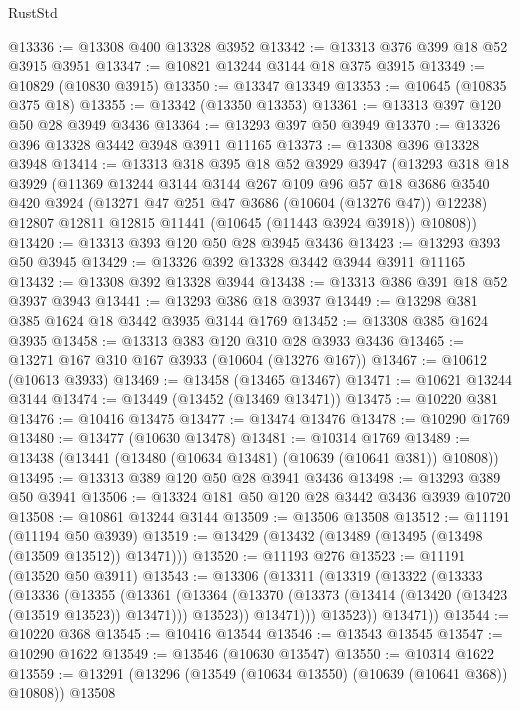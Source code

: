 \begin{lexlean}{RustStd}
\begin{coremodule}
@13336 := @13308 @400 @13328 @3952
@13342 := @13313 @376 @399 @18 @52 @3915 @3951
@13347 := @10821 @13244 @3144 @18 @375 @3915
@13349 := @10829 (@10830 @3915)
@13350 := @13347 @13349
@13353 := @10645 (@10835 @375 @18)
@13355 := @13342 (@13350 @13353)
@13361 := @13313 @397 @120 @50 @28 @3949 @3436
@13364 := @13293 @397 @50 @3949
@13370 := @13326 @396 @13328 @3442 @3948 @3911 @11165
@13373 := @13308 @396 @13328 @3948
@13414 := @13313
    @318
    @395
    @18
    @52
    @3929
    @3947
    (@13293
      @318
      @18
      @3929
      (@11369
        @13244
        @3144
        @3144
        @267
        @109
        @96
        @57
        @18
        @3686
        @3540
        @420
        @3924
        (@13271 @47 @251 @47 @3686 (@10604 (@13276 @47)) @12238)
        @12807
        @12811
        @12815
        @11441
        (@10645 (@11443 @3924 @3918))
        @10808))
@13420 := @13313 @393 @120 @50 @28 @3945 @3436
@13423 := @13293 @393 @50 @3945
@13429 := @13326 @392 @13328 @3442 @3944 @3911 @11165
@13432 := @13308 @392 @13328 @3944
@13438 := @13313 @386 @391 @18 @52 @3937 @3943
@13441 := @13293 @386 @18 @3937
@13449 := @13298 @381 @385 @1624 @18 @3442 @3935 @3144 @1769
@13452 := @13308 @385 @1624 @3935
@13458 := @13313 @383 @120 @310 @28 @3933 @3436
@13465 := @13271 @167 @310 @167 @3933 (@10604 (@13276 @167))
@13467 := @10612 (@10613 @3933)
@13469 := @13458 (@13465 @13467)
@13471 := @10621 @13244 @3144
@13474 := @13449 (@13452 (@13469 @13471))
@13475 := @10220 @381
@13476 := @10416 @13475
@13477 := @13474 @13476
@13478 := @10290 @1769
@13480 := @13477 (@10630 @13478)
@13481 := @10314 @1769
@13489 := @13438 (@13441 (@13480 (@10634 @13481) (@10639 (@10641 @381)) @10808))
@13495 := @13313 @389 @120 @50 @28 @3941 @3436
@13498 := @13293 @389 @50 @3941
@13506 := @13324 @181 @50 @120 @28 @3442 @3436 @3939 @10720
@13508 := @10861 @13244 @3144
@13509 := @13506 @13508
@13512 := @11191 (@11194 @50 @3939)
@13519 := @13429 (@13432 (@13489 (@13495 (@13498 (@13509 @13512)) @13471)))
@13520 := @11193 @276
@13523 := @11191 (@13520 @50 @3911)
@13543 := @13306
    (@13311
      (@13319
        (@13322
          (@13333
            (@13336
              (@13355
                (@13361
                  (@13364
                    (@13370 (@13373 (@13414 (@13420 (@13423 (@13519 @13523)) @13471))) @13523))
                  @13471)))
            @13523))
        @13471))
@13544 := @10220 @368
@13545 := @10416 @13544
@13546 := @13543 @13545
@13547 := @10290 @1622
@13549 := @13546 (@10630 @13547)
@13550 := @10314 @1622
@13559 := @13291 (@13296 (@13549 (@10634 @13550) (@10639 (@10641 @368)) @10808)) @13508

\end{coremodule}
\end{lexlean}
